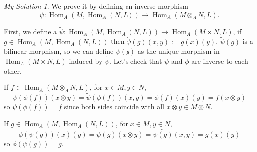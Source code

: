 \documentclass[]{article}
\theoremstyle{remark}
\newtheorem*{sol}{My Solution}
\begin{document}
\begin{sol}
	We prove it by defining an inverse morphism
	\[ \psi: \operatorname{Hom}_{A}\left(M, \operatorname{Hom}_{A}(N, L)\right) \longrightarrow \operatorname{Hom}_{A}\left(M \otimes_{A} N, L\right) . \]
	
	First, we define a
	$\tilde{\psi}: \operatorname{Hom}_{A}\left(M, \operatorname{Hom}_{A}(N, L)\right) \rightarrow \operatorname{Hom}_{A}\left(M \times N, L\right) $, if $ g \in \operatorname{Hom}_{A}\left(M, \operatorname{Hom}_{A}(N, L)\right) $ then
	$ \tilde{\psi}(g)(x, y) := g(x)(y)  $. $ \tilde{\psi}(g) $ is a bilinear morphism, so we can define $ \psi(g) $ as the unique morphism in $ \operatorname{Hom}_{A}\left(M \times N, L\right) $ induced by $ \tilde{\psi} $. Let's check that $ \psi $ and $ \phi $ are inverse to each other.
	
	If $f \in \operatorname{Hom}_{A}\left(M \otimes_{A} N, L\right)$, for $ x \in M, y \in N $,
	\[ \psi(\phi(f))(x \otimes y) = \tilde{\psi} (\phi(f))(x , y) = \phi(f)(x)(y)=f(x \otimes y)  \]
	so $  \psi(\phi(f)) = f $ since both sides coincide with all $ x\otimes y \in M\otimes N $.
	
	If $ g \in \operatorname{Hom}_{A}\left(M, \operatorname{Hom}_{A}(N, L)\right) $, for $ x \in M, y \in N $,
	\[ \phi(\psi(g))(x)(y) = \psi(g)(x \otimes y) = \tilde{\psi(g)}(x,y) = g(x)(y) \]
	so $ \phi(\psi(g)) =g $.
	
\end{sol}
 
\end{document}

